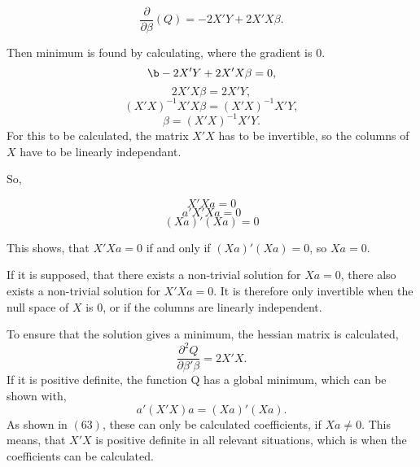 \begin{equation}
\frac{\partial}{\partial \beta}(Q)=-2 X' Y + 2X' X \beta .
\end{equation}

\noindent Then minimum is found by calculating, where the gradient is 0.
\begin{equation}\b-2 X' Y+ 2X' X \beta =0,\end{equation}
\begin{equation} 2X' X \beta = 2X' Y,\end{equation}
\begin{equation}(X' X)^{-1} X' X \beta = (X' X)^{-1} X' Y,\end{equation}
\begin{equation} \beta=(X' X)^{-1} X' Y.\end{equation}
  For this to be calculated, the matrix $X' X$ has to be invertible, so the columns of $X$ have to be linearly independant.
 
 \noindent So, 
 
\begin{equation}
 	X' Xa  =0
\end{equation}
\begin{equation}
 	a' X' X a =0
\end{equation}
\begin{equation}
 	(Xa)'(Xa)=0
\end{equation}
 
 \noindent This shows, that $X'Xa=0$ if and only if $(Xa)'(Xa)=0$, so $Xa=0$. 
 
 \noindent If it is supposed, that there exists a non-trivial solution for $Xa=0$, there also exists a non-trivial solution for $X'Xa=0$. It is therefore only invertible when the null space of $X$ is 0, or if the columns are linearly independent. 
 
\noindent To ensure that the solution gives a minimum, the hessian matrix is calculated,
\begin{equation}
 \frac{\partial^2 Q}{\partial \beta' \beta}=2X'X.
\end{equation} 
 \noindent If it is positive definite, the function Q has a global minimum, which can be shown with,
\begin{equation}
 a' (X' X)a = (Xa)' (Xa).
\end{equation}  
 \noindent As shown in $(63)$,
 these can only be calculated coefficients, if $Xa \not= 0$. This means, that $X'X$ is positive definite in all relevant situations, which is when the coefficients can be calculated. 
 
